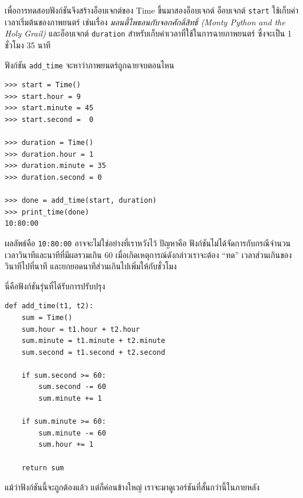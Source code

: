 เพื่อการทดสอบฟังก์ชันจึงสร้างอ็อบเจกต์ของ Time ขึ้นมาสองอ็อบเจกต์ อ็อบเจกต์ {\tt start} ใช้เก็บค่าเวลาเริ่มต้นของภาพยนตร์ 
เช่นเรื่อง {\em มอนตี้ไพธอนกับจอกศักดิ์สิทธิ์ (Monty Python and the Holy Grail)} และอ็อบเจกต์ {\tt duration} 
สำหรับเก็บค่าเวลาที่ใช้ในการฉายภาพยนตร์ ซึ่งจะเป็น 1 ชั่วโมง 35 นาที

ฟังก์ชัน \verb"add_time" จะหาว่าภาพยนตร์ถูกฉายจบตอนไหน

\begin{verbatim}
>>> start = Time()
>>> start.hour = 9
>>> start.minute = 45
>>> start.second =  0

>>> duration = Time()
>>> duration.hour = 1
>>> duration.minute = 35
>>> duration.second = 0

>>> done = add_time(start, duration)
>>> print_time(done)
10:80:00
\end{verbatim}
%

ผลลัพธ์คือ {\tt 10:80:00} อาจจะไม่ใช่อย่างที่เราหวังไว้ ปัญหาคือ ฟังก์ชันไม่ได้จัดการกับกรณีจำนวนเวลาวินาทีและนาทีที่มีผลรวมเกิน 60 
เมื่อเกิดเหตุการณ์ดังกล่าวเราจะต้อง ``ทด'' เวลาส่วนเกินของวินาทีไปที่นาที และยกยอดนาทีส่วนเกินไปเพิ่มให้กับชั่วโมง

นี่คือฟังก์ชันรุ่นที่ได้รับการปรับปรุง

\begin{verbatim}
def add_time(t1, t2):
    sum = Time()
    sum.hour = t1.hour + t2.hour
    sum.minute = t1.minute + t2.minute
    sum.second = t1.second + t2.second

    if sum.second >= 60:
        sum.second -= 60
        sum.minute += 1

    if sum.minute >= 60:
        sum.minute -= 60
        sum.hour += 1

    return sum
\end{verbatim}
%
แม้ว่าฟังก์ชันนี้จะถูกต้องแล้ว แต่ก็ค่อนข้างใหญ่ เราจะมาดูเวอร์ชันที่สั้นกว่านี้ในภายหลัง

